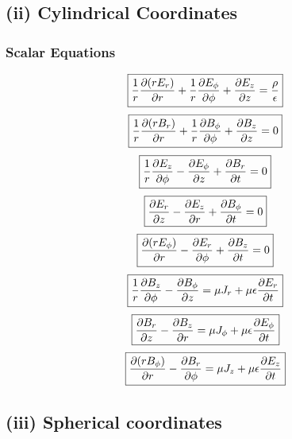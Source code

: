 \documentclass[11pt, a4paper]{article}
\begin{document}
\subsection*{(ii) Cylindrical Coordinates}

\subsubsection*{Scalar Equations}
\begin{equation}
\boxed{\frac{1}{r}\pdv{(rE_r)}{r}+\frac{1}{r}\pdv{E_\phi}{\phi}+\pdv{E_{z} }{z} = \frac{\rho}{\epsilon }}
\end{equation}
\begin{equation}
\boxed{\frac{1}{r}\pdv{(rB_r)}{r}+\frac{1}{r}\pdv{B_\phi}{\phi}+\pdv{B_z}{z} = 0}
\end{equation}
\begin{equation}
\boxed{\frac{1}{r}\pdv{E_z}{\phi}-\pdv{E_\phi}{z}+\pdv{B_r}{t} =0}
\end{equation}
\begin{equation}
\boxed{ \pdv{E_r}{z}-\pdv{E_z}{r}+\pdv{B_\phi}{t}=0 }
\end{equation}
\begin{equation}
\boxed{\pdv{(rE_\phi)}{r}-\pdv{E_r}{\phi}+\pdv{B_z}{t}=0}
\end{equation}
\begin{equation}
\boxed{\frac{1}{r}\pdv{B_z}{\phi}-\pdv{B_\phi}{z}=\mu J_r + \mu \epsilon \pdv{E_r}{t}}
\end{equation}
\begin{equation}
\boxed{\pdv{B_r}{z}-\pdv{B_z}{r}=\mu J_\phi + \mu \epsilon \pdv{E_\phi}{t}}
\end{equation}
\begin{equation}
\boxed{\pdv{(rB_\phi)}{r}-\pdv{B_r}{\phi}=\mu J_z + \mu \epsilon \pdv{E_z}{t}}
\end{equation}
\subsection*{(iii) Spherical coordinates}
\end{document}
